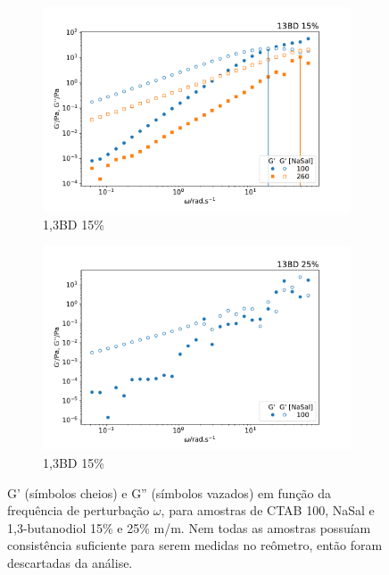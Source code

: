 	\begin{figure}[h]
		\begin{subfigure}[t]{0.5\textwidth}
			\centering
			\includegraphics[width=\textwidth]{imagens/reologia/oscilatorio_13bd15p}
			\caption{1,3BD 15\%}
			\label{fig:oscilatorio_13bd_15p}
		\end{subfigure} %
		\begin{subfigure}[t]{0.5\textwidth}
			\centering
			\includegraphics[width=\textwidth]{imagens/reologia/oscilatorio_13bd25p}
			\caption{1,3BD 15\%}
			\label{fig:oscilatorio_13bd_25p}
		\end{subfigure} %
		\caption{G' (símbolos cheios) e G'' (símbolos vazados) em função da frequência de perturbação \(\omega\), para amostras de CTAB 100\mM{}, NaSal e 1,3-butanodiol 15\% e 25\% m/m. Nem todas as amostras possuíam consistência suficiente para serem medidas no reômetro, então foram descartadas da análise.}
		\label{fig:oscilatorio_13bd}
	\end{figure}


